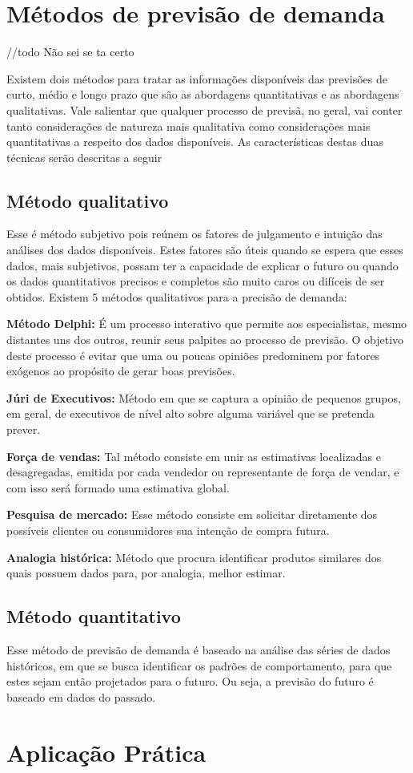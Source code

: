 \section{Métodos de previsão de demanda}
//todo Não sei se ta certo

Existem dois métodos para tratar as informações disponíveis das previsões de curto, médio e longo prazo que são as abordagens quantitativas e as abordagens qualitativas. Vale salientar que qualquer processo de previsã, no geral, vai conter tanto considerações de natureza mais qualitativa como considerações mais quantitativas a respeito dos dados disponíveis. As características destas duas técnicas serão descritas a seguir 

\subsection{Método qualitativo}

Esse é método subjetivo pois reúnem os fatores de julgamento e intuição das análises dos dados disponíveis. Estes fatores são úteis quando se espera que esses dados, mais subjetivos, possam ter a capacidade de explicar o futuro ou quando os dados quantitativos precisos e completos são muito caros ou difíceis de ser obtidos. Existem 5 métodos qualitativos para a precisão de demanda: 

\textbf{Método Delphi:} É um processo interativo que permite aos especialistas, mesmo distantes uns dos outros, reunir seus palpites ao processo de previsão. O objetivo deste processo é evitar que uma ou poucas opiniões predominem por fatores exógenos ao propósito de gerar boas previsões. 

\textbf{Júri de Executivos:} Método em que se captura a opinião de pequenos grupos, em geral, de executivos de nível alto sobre alguma variável que se pretenda prever.

\textbf{Força de vendas:} Tal método consiste em unir as estimativas localizadas e desagregadas, emitida por cada vendedor ou representante de força de vendar, e com isso será formado uma estimativa global.

\textbf{Pesquisa de mercado:} Esse método consiste em solicitar diretamente dos possíveis clientes ou consumidores  sua intenção de compra futura.

\textbf{Analogia histórica:} Método que procura identificar produtos similares dos quais possuem dados para, por analogia, melhor estimar.

\subsection{Método quantitativo}

Esse método de previsão de demanda é baseado na análise das séries de dados históricos, em que se busca identificar os padrões de comportamento, para que estes sejam então projetados para o futuro. Ou seja, a previsão do futuro é baseado em dados do passado.

\section{Aplicação Prática} 
\label{sec:introducao_ao_planejamento_aplicacao}

